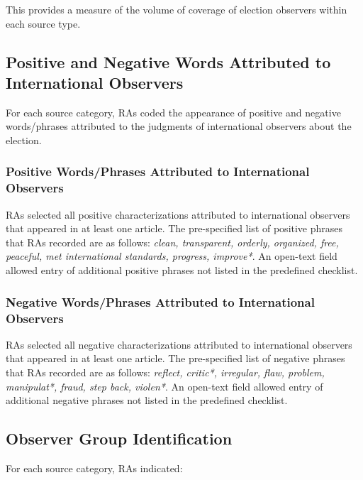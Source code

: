 \documentclass[USletter,12pt, titlepage]{article} %
\begin{document}
This provides a measure of the volume of coverage of election observers within each source type.

\subsection{Positive and Negative Words Attributed to International Observers}

For each source category, RAs coded the appearance of positive and negative words/phrases attributed to the judgments of international observers about the election.

\subsubsection{Positive Words/Phrases Attributed to International Observers}

RAs selected all positive characterizations attributed to international observers that appeared in at least one article. The pre-specified list of positive phrases that RAs recorded are as follows:  \textit{clean, transparent, orderly, organized, free,
peaceful, met international standards, progress, improve*}. An open-text field allowed entry of additional positive phrases not listed in the predefined checklist.

\subsubsection{Negative Words/Phrases Attributed to International Observers}

RAs selected all negative characterizations attributed to international observers that appeared in at least one article. The pre-specified list of negative phrases that RAs recorded are as follows: \textit{reflect, critic*, irregular, flaw, problem, manipulat*, fraud, step back, violen*}. An open-text field allowed entry of additional negative phrases not listed in the predefined checklist.


\subsection{Observer Group Identification}

For each source category, RAs indicated:
\end{document}
